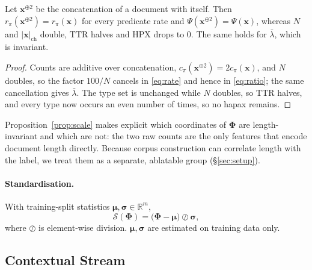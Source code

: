 \begin{proposition}
\label{prop:scale}
Let $\mathbf{x}^{\oplus 2}$ be the concatenation of a document with itself. Then
$r_\pi(\mathbf{x}^{\oplus 2})=r_\pi(\mathbf{x})$ for every predicate rate and $\Psi(\mathbf{x}^{\oplus2})=\Psi(\mathbf{x})$,
whereas $N$ and $|\mathbf{x}|_{\text{ch}}$ double, $\mathrm{TTR}$ halves and $\mathrm{HPX}$ drops to $0$.
The same holds for $\bar\lambda$, which is invariant.
\end{proposition}
\begin{proof}
Counts are additive over concatenation, $c_\pi(\mathbf{x}^{\oplus2})=2c_\pi(\mathbf{x})$, and $N$ doubles, so the
factor $100/N$ cancels in \eqref{eq:rate} and hence in \eqref{eq:ratio}; the same cancellation gives
$\bar\lambda$. The type set is unchanged while $N$ doubles, so $\mathrm{TTR}$ halves, and every type now
occurs an even number of times, so no hapax remains.
\end{proof}

Proposition~\ref{prop:scale} makes explicit which coordinates of $\bm{\Phi}$ are length-invariant and which
are not: the two raw counts are the only features that encode document length directly. Because corpus
construction can correlate length with the label, we treat them as a separate, ablatable group
(\S\ref{sec:setup}).

\paragraph{Standardisation.}
With training-split statistics $\bm{\mu},\bm{\sigma}\in\mathbb{R}^{m}$,
\begin{equation}
\mathcal{S}(\bm{\Phi})=\big(\bm{\Phi}-\bm{\mu}\big)\oslash\bm{\sigma},
\end{equation}
where $\oslash$ is element-wise division. $\bm{\mu},\bm{\sigma}$ are estimated on training data only.

\subsection{Contextual Stream}
\label{sec:contextual}

